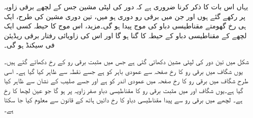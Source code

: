 یہاں اس بات کا ذکر کرنا ضروری ہے کہ  دور کی لپٹی مشین جس کے لچھے  برقی زاویہ پر رکھے گئے ہوں اور جن میں برقی رو    دوری  ہو میں، تین دوری مشین  کی طرح، ایک ہی رخ گھومتے  مقناطیسی دباو کی  موج  پیدا ہو گی۔مزید، اس موج کا حیطہ کسی ایک لچھے کے مقناطیسی دباو کے حیطہ  کا   گنا ہو گا اور اس کی زاویائی  رفتار  برقی ریڈیئن فی سیکنڈ ہو گی۔

شکل   میں تین دور کی لپٹی مشین دکھائی گئی ہے جس میں مثبت برقی رو کے رخ  دکھائے گئے ہیں۔یوں   شگاف میں برقی رو کا رخ صفحہ سے عمودی  باہر کو  ہے  جسے نقطہ سے ظاہر کیا گیا ہے۔ اسی طرح  شگاف میں برقی رو کا رخ صفحہ میں عمودی  اندر  کو ہے اور  جسے صلیب کے نشان سے ظاہر کیا گیا ہے۔یوں شگاف  اور  میں مثبت برقی رو کا مقناطیسی دباو  صفر زاویہ پر ہو گا جو عین لچھا  کا رخ  ہے۔ لچھے میں برقی رو سے پیدا مقناطیسی دباو  کا رخ دائیں ہاتھ کے قانون سے معلوم کیا جا سکتا ہے۔

